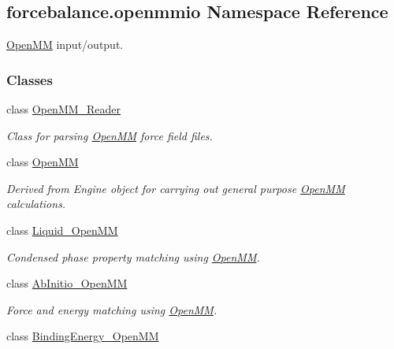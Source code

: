 \hypertarget{namespaceforcebalance_1_1openmmio}{\subsection{forcebalance.\-openmmio Namespace Reference}
\label{namespaceforcebalance_1_1openmmio}
}


\hyperlink{classforcebalance_1_1openmmio_1_1OpenMM}{Open\-M\-M} input/output.  


\subsubsection*{Classes}
\begin{DoxyCompactItemize}
\item 
class \hyperlink{classforcebalance_1_1openmmio_1_1OpenMM__Reader}{Open\-M\-M\-\_\-\-Reader}
\begin{DoxyCompactList}\small\item\em Class for parsing \hyperlink{classforcebalance_1_1openmmio_1_1OpenMM}{Open\-M\-M} force field files. \end{DoxyCompactList}\item 
class \hyperlink{classforcebalance_1_1openmmio_1_1OpenMM}{Open\-M\-M}
\begin{DoxyCompactList}\small\item\em Derived from Engine object for carrying out general purpose \hyperlink{classforcebalance_1_1openmmio_1_1OpenMM}{Open\-M\-M} calculations. \end{DoxyCompactList}\item 
class \hyperlink{classforcebalance_1_1openmmio_1_1Liquid__OpenMM}{Liquid\-\_\-\-Open\-M\-M}
\begin{DoxyCompactList}\small\item\em Condensed phase property matching using \hyperlink{classforcebalance_1_1openmmio_1_1OpenMM}{Open\-M\-M}. \end{DoxyCompactList}\item 
class \hyperlink{classforcebalance_1_1openmmio_1_1AbInitio__OpenMM}{Ab\-Initio\-\_\-\-Open\-M\-M}
\begin{DoxyCompactList}\small\item\em Force and energy matching using \hyperlink{classforcebalance_1_1openmmio_1_1OpenMM}{Open\-M\-M}. \end{DoxyCompactList}\item 
class \hyperlink{classforcebalance_1_1openmmio_1_1BindingEnergy__OpenMM}{Binding\-Energy\-\_\-\-Open\-M\-M}

\end{DoxyCompactItemize}
